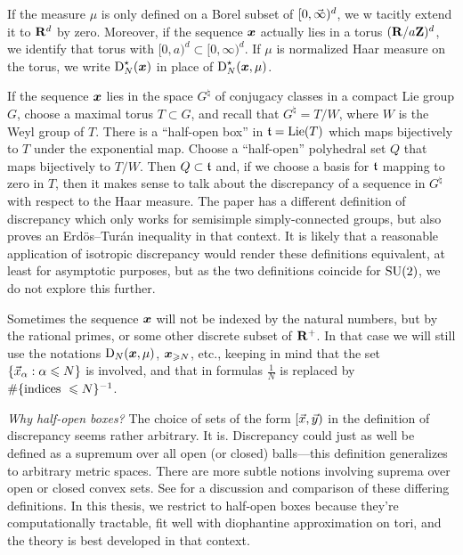 If the measure $\mu$ is only defined on a Borel subset of $[0,\vec{\infty})^d$, we w
tacitly extend it to $\mathbf{R}^d$ by zero. Moreover, if the sequence ${\boldsymbol x}$ actually 
lies in a torus $(\mathbf{R}/a \mathbf{Z})^d$, we identify that torus with  
$[0,a)^d\subset [0,\infty)^d$. If $\mu$ is normalized Haar measure on the 
torus, we write $\operatorname{D}_N^\star({\boldsymbol x})$ in place of $\operatorname{D}_N^\star({\boldsymbol x}, \mu)$. 

If the sequence ${\boldsymbol x}$ lies in the space $G^\natural$ of conjugacy classes in a 
compact Lie group $G$, choose a maximal torus $T\subset G$, and recall that 
$G^\natural = T/W$, where $W$ is the Weyl group of $T$. There is a ``half-open 
box'' in $\mathfrak{t} = \operatorname{Lie}(T)$ which maps bijectively to $T$ under the exponential 
map. Choose a ``half-open'' polyhedral set $Q$ that maps bijectively to $T/W$. 
Then $Q\subset \mathfrak{t}$ and, if we choose a basis for $\mathfrak{t}$ mapping to zero in 
$T$, then it makes sense to talk about the discrepancy of a sequence in 
$G^\natural$ with respect to the Haar measure. The paper 
\cite{rosengarten-2013} has a different definition of discrepancy which only 
works for semisimple simply-connected groups, but also proves an 
Erd\"os--Tur\'an inequality in that context. It is likely that a reasonable 
application of isotropic discrepancy would render these definitions equivalent, 
at least for asymptotic purposes, but as the two definitions coincide for 
$\operatorname{SU}(2)$, we do not explore this further. 

Sometimes the sequence ${\boldsymbol x}$ will not be indexed by the natural numbers, but 
by the rational primes, or some other discrete subset of $\mathbf{R}^+$. In that case 
we will still use the notations $\operatorname{D}_N({\boldsymbol x},\mu)$, ${\boldsymbol x}_{\geqslant N}$, etc., 
keeping in mind that the set $\{\vec{x}_\alpha : \alpha \leqslant N\}$ is involved, 
and that in formulas $\frac{1}{N}$ is replaced by 
$\#\{\textnormal{indices }\leqslant N\}^{-1}$. 

\emph{Why half-open boxes?} The choice of sets of the form $[\vec{x},\vec{y})$ in the 
definition of discrepancy seems rather arbitrary. It is. Discrepancy could just 
as well be defined as a supremum over all open (or closed) balls---this 
definition generalizes to arbitrary metric spaces. There are more subtle 
notions involving suprema over open or closed convex sets. See 
\cite{kuipers-niederreiter-1974} for a discussion and comparison of these 
differing definitions. In this thesis, we restrict to half-open boxes because 
they're computationally tractable, fit well with diophantine approximation on 
tori, and the theory is best developed in that context. 





